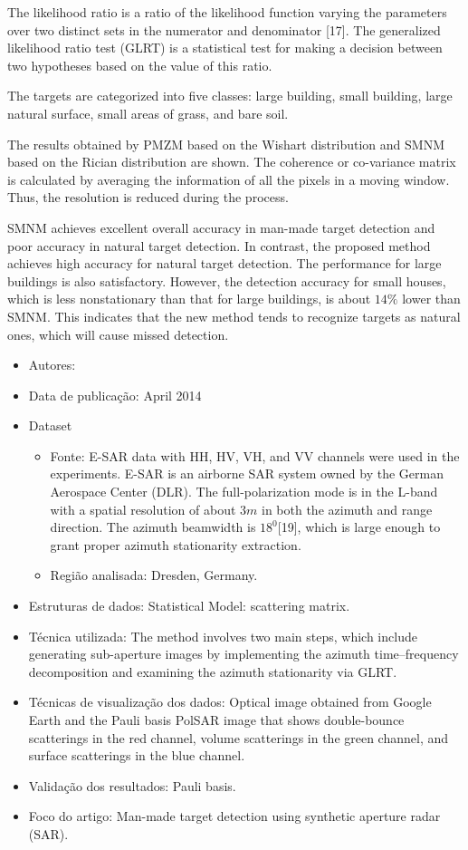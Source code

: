 \documentclass[paper=a4, fontsize=11pt]{scrartcl}
\begin{document}
The likelihood ratio is a ratio of the likelihood function varying the parameters over two distinct sets in the numerator and denominator [17]. 
The generalized likelihood ratio test (GLRT) is a statistical test for making a decision between two hypotheses based on the value of this ratio.

The targets are categorized into five classes: large building, small building, large natural surface, small areas of grass, and bare soil.

The results obtained by PMZM based on the Wishart distribution and SMNM based on the Rician distribution are shown.
The coherence or co-variance matrix is calculated by averaging the information of all the pixels in a moving window. 
Thus, the resolution is reduced during the process.

SMNM achieves excellent overall accuracy in man-made target detection and poor accuracy in natural target detection.
In contrast, the proposed method achieves high accuracy for natural target detection. 
The performance for large buildings is also satisfactory. 
However, the detection accuracy for small houses, which is less nonstationary than that for large buildings, is about $14\%$ lower than SMNM. 
This indicates that the new method tends to recognize targets as natural ones, which will cause missed detection.

\begin{itemize}
    \item Autores:~\cite{wu2014urban}
    \item Data de publicação: April 2014
    \item Dataset
    \begin{itemize}
        \item Fonte: E-SAR data with HH, HV, VH, and VV channels were used in the experiments. E-SAR is an airborne SAR system owned by the German Aerospace Center (DLR). The full-polarization mode is in the L-band with a spatial resolution of about $3m$ in both the azimuth and range direction. The azimuth beamwidth is $18^0$[19], which is large enough to grant proper azimuth stationarity extraction.
        \item Região analisada: Dresden, Germany.
    \end{itemize}
    \item Estruturas de dados: Statistical Model: scattering matrix.
    \item Técnica utilizada: The method involves two main steps, which include generating sub-aperture images by implementing the azimuth time–frequency decomposition and examining the azimuth stationarity via GLRT.
    \item Técnicas de visualização dos dados: Optical image obtained from Google Earth and the Pauli basis PolSAR image that shows double-bounce scatterings in the red channel, volume scatterings in the green channel, and surface scatterings in the blue channel.
    \item Validação dos resultados: Pauli basis.
    \item Foco do artigo: Man-made target detection using synthetic aperture radar (SAR).
\end{itemize}
\end{document}
